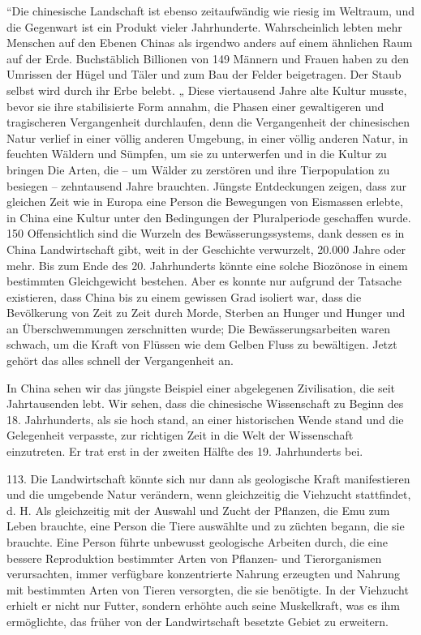 \documentclass[11pt,a4paper]{book}
\begin{document}
“Die chinesische Landschaft ist ebenso zeitaufwändig wie riesig im Weltraum, und die Gegenwart ist ein Produkt vieler Jahrhunderte. Wahrscheinlich lebten mehr Menschen auf den Ebenen Chinas als irgendwo anders auf einem ähnlichen Raum auf der Erde. Buchstäblich Billionen von 149 Männern und Frauen haben zu den Umrissen der Hügel und Täler und zum Bau der Felder beigetragen. Der Staub selbst wird durch ihr Erbe belebt. „ Diese viertausend Jahre alte Kultur musste, bevor sie ihre stabilisierte Form annahm, die Phasen einer gewaltigeren und tragischeren Vergangenheit durchlaufen, denn die Vergangenheit der chinesischen Natur verlief in einer völlig anderen Umgebung, in einer völlig anderen Natur, in feuchten Wäldern und Sümpfen, um sie zu unterwerfen und in die Kultur zu bringen Die Arten, die -- um Wälder zu zerstören und ihre Tierpopulation zu besiegen -- zehntausend Jahre brauchten. Jüngste Entdeckungen zeigen, dass zur gleichen Zeit wie in Europa eine Person die Bewegungen von Eismassen erlebte, in China eine Kultur unter den Bedingungen der Pluralperiode geschaffen wurde. 150 Offensichtlich sind die Wurzeln des Bewässerungssystems, dank dessen es in China Landwirtschaft gibt, weit in der Geschichte verwurzelt, 20.000 Jahre oder mehr. Bis zum Ende des 20. Jahrhunderts könnte eine solche Biozönose in einem bestimmten Gleichgewicht bestehen. Aber es konnte nur aufgrund der Tatsache existieren, dass China bis zu einem gewissen Grad isoliert war, dass die Bevölkerung von Zeit zu Zeit durch Morde, Sterben an Hunger und Hunger und an Überschwemmungen zerschnitten wurde; Die Bewässerungsarbeiten waren schwach, um die Kraft von Flüssen wie dem Gelben Fluss zu bewältigen. Jetzt gehört das alles schnell der Vergangenheit an.



In China sehen wir das jüngste Beispiel einer abgelegenen Zivilisation, die seit Jahrtausenden lebt. Wir sehen, dass die chinesische Wissenschaft zu Beginn des 18. Jahrhunderts, als sie hoch stand, an einer historischen Wende stand und die Gelegenheit verpasste, zur richtigen Zeit in die Welt der Wissenschaft einzutreten. Er trat erst in der zweiten Hälfte des 19. Jahrhunderts bei.



113. Die Landwirtschaft könnte sich nur dann als geologische Kraft manifestieren und die umgebende Natur verändern, wenn gleichzeitig die Viehzucht stattfindet, d. H. Als gleichzeitig mit der Auswahl und Zucht der Pflanzen, die Emu zum Leben brauchte, eine Person die Tiere auswählte und zu züchten begann, die sie brauchte. Eine Person führte unbewusst geologische Arbeiten durch, die eine bessere Reproduktion bestimmter Arten von Pflanzen- und Tierorganismen verursachten, immer verfügbare konzentrierte Nahrung erzeugten und Nahrung mit bestimmten Arten von Tieren versorgten, die sie benötigte. In der Viehzucht erhielt er nicht nur Futter, sondern erhöhte auch seine Muskelkraft, was es ihm ermöglichte, das früher von der Landwirtschaft besetzte Gebiet zu erweitern.
\end{document}
